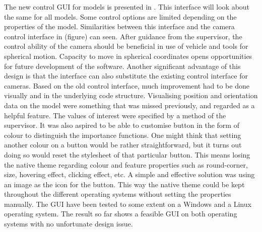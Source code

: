 The new control GUI for models is presented in . This interface will look about the same for all models. Some control options are limited depending on the properties of the model. Similarities between this interface and the camera control interface in (figure) can seen. After guidance from the supervisor, the control ability of the camera should be beneficial in use of vehicle and tools for spherical motion. Capacity to move in spherical coordinates opens opportunities for future development of the software. Another significant advantage of this design is that the interface can also substitute the existing control interface for cameras. Based on the old control interface, much improvement had to be done visually and in the underlying code structure. Visualising position and orientation data on the model were something that was missed previously, and regarded as a helpful feature. The values of interest were specified by a method of the supervisor.  It was also aspired to be able to customise button in the form of colour to distinguish the importance functions. One might think that setting another colour on a button would be rather straightforward, but it turns out doing so would reset the stylesheet of that particular button. This means losing the native theme regarding colour and feature properties such as round-corner, size, hovering effect, clicking effect, etc. A simple and effective solution was using an image as the icon for the button. This way the native theme could be kept throughout the different operating systems without setting the properties manually. The GUI have been tested to some extent on a Windows and a Linux operating system. The result so far shows a feasible GUI on both operating systems with no unfortunate design issue. 


